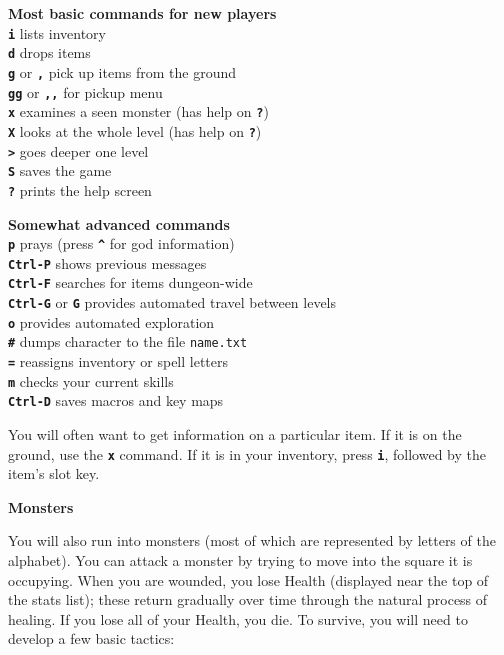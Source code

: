 \documentclass[a4paper,10pt]{article}
\newcommand{\key}[1]{{{\texttt{\textbf{#1}}}}} %
\newcommand{\sex}[1]{{{\textbf{#1}}}} %
\newcommand{\spacecolumn}{\begin{minipage}[t]{2cm}\phantom{xxxx}\end{minipage}}
\newcommand{\para}{\vspace{1.5ex}}
\begin{document}
\begin{minipage}[t]{7cm}
\sex{Most basic commands for new players} \\
\key{i} lists inventory \\
\key{d}	drops items \\
\key{g} or \key{,} pick up items from the ground \\
\key{gg} or \key{,,} for pickup menu \\
\key{x} examines a seen monster (has help on \key{?}) \\
\key{X} looks at the whole level (has help on \key{?}) \\
\key{>} goes deeper one level \\
\key{S} saves the game \\
\key{?} prints the help screen
\end{minipage}
%
\spacecolumn
%
\begin{minipage}[t]{7cm}
\sex{Somewhat advanced commands} \\
\key{p} prays (press \key{\^} for god information) \\
\key{Ctrl-P} shows previous messages \\
\key{Ctrl-F} searches for items dungeon-wide \\
\key{Ctrl-G} or \key{G} provides automated travel between levels \\
\key{o} provides automated exploration \\
\key{\#} dumps character to the file \texttt{name.txt} \\
\key{=} reassigns inventory or spell letters \\
\key{m} checks your current skills \\ 
\key{Ctrl-D} saves macros and key maps
\end{minipage}

\para

You will often want to get information on a particular item. If it is on the
ground, use the \key{x} command. If it is in your inventory, press \key{i},
followed by the item's slot key.

\para\para

\sex{Monsters} \para 

You will also run into monsters (most of which are represented by letters of 
the alphabet). You can attack a monster by trying to move into the square it 
is occupying. 
When you are wounded, you lose Health (displayed near the top of the stats 
list); these return gradually over time through the natural process of 
healing. If you lose all of your Health, you die. 
To survive, you will need to develop a few basic tactics: \\
\end{document}
